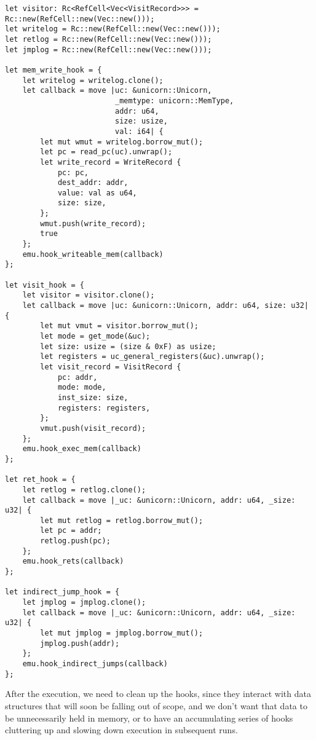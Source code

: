 \documentclass[11pt]{article}
\begin{document}
\lstset{language=rust,label=org9f41a42,caption= ,captionpos=b,numbers=none}
\begin{lstlisting}
let visitor: Rc<RefCell<Vec<VisitRecord>>> = Rc::new(RefCell::new(Vec::new()));
let writelog = Rc::new(RefCell::new(Vec::new()));
let retlog = Rc::new(RefCell::new(Vec::new()));
let jmplog = Rc::new(RefCell::new(Vec::new()));

let mem_write_hook = {
    let writelog = writelog.clone();
    let callback = move |uc: &unicorn::Unicorn,
                         _memtype: unicorn::MemType,
                         addr: u64,
                         size: usize,
                         val: i64| {
        let mut wmut = writelog.borrow_mut();
        let pc = read_pc(uc).unwrap();
        let write_record = WriteRecord {
            pc: pc,
            dest_addr: addr,
            value: val as u64,
            size: size,
        };
        wmut.push(write_record);
        true
    };
    emu.hook_writeable_mem(callback)
};

let visit_hook = {
    let visitor = visitor.clone();
    let callback = move |uc: &unicorn::Unicorn, addr: u64, size: u32| {
        let mut vmut = visitor.borrow_mut();
        let mode = get_mode(&uc);
        let size: usize = (size & 0xF) as usize;
        let registers = uc_general_registers(&uc).unwrap();
        let visit_record = VisitRecord {
            pc: addr,
            mode: mode,
            inst_size: size,
            registers: registers,
        };
        vmut.push(visit_record);
    };
    emu.hook_exec_mem(callback)
};

let ret_hook = {
    let retlog = retlog.clone();
    let callback = move |_uc: &unicorn::Unicorn, addr: u64, _size: u32| {
        let mut retlog = retlog.borrow_mut();
        let pc = addr;
        retlog.push(pc);
    };
    emu.hook_rets(callback)
};

let indirect_jump_hook = {
    let jmplog = jmplog.clone();
    let callback = move |_uc: &unicorn::Unicorn, addr: u64, _size: u32| {
        let mut jmplog = jmplog.borrow_mut();
        jmplog.push(addr);
    };
    emu.hook_indirect_jumps(callback)
};
\end{lstlisting}

After the execution, we need to clean up the hooks, since they interact
with data structures that will soon be falling out of scope, and we don't
want that data to be unnecessarily held in memory, or to have an accumulating
series of hooks cluttering up and slowing down execution in subsequent runs.
\end{document}
